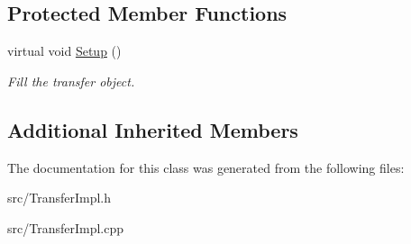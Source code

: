 \subsection*{Protected Member Functions}
\begin{DoxyCompactItemize}
\item 
\hypertarget{class_lib_u_s_b_1_1_bulk_transfer_impl_a16f5e873f5526eab10de64e2962c00f0}{virtual void \hyperlink{class_lib_u_s_b_1_1_bulk_transfer_impl_a16f5e873f5526eab10de64e2962c00f0}{Setup} ()}\label{class_lib_u_s_b_1_1_bulk_transfer_impl_a16f5e873f5526eab10de64e2962c00f0}

\begin{DoxyCompactList}\small\item\em Fill the transfer object. \end{DoxyCompactList}\end{DoxyCompactItemize}
\subsection*{Additional Inherited Members}


The documentation for this class was generated from the following files\-:\begin{DoxyCompactItemize}
\item 
src/Transfer\-Impl.\-h\item 
src/Transfer\-Impl.\-cpp\end{DoxyCompactItemize}
